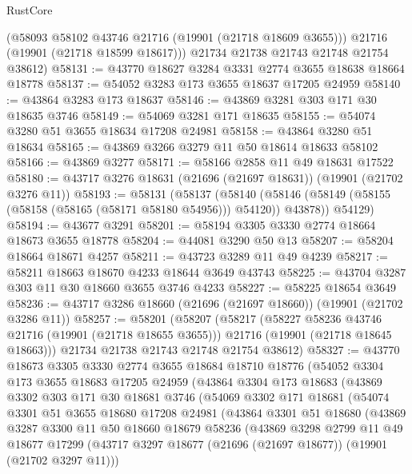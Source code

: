 \begin{lexlean}{RustCore}
\begin{coremodule}
        (@58093 @58102 @43746 @21716 (@19901 (@21718 @18609 @3655)))
        @21716
        (@19901 (@21718 @18599 @18617)))
      @21734
      @21738
      @21743
      @21748
      @21754
      @38612)
@58131 := @43770 @18627 @3284 @3331 @2774 @3655 @18638 @18664 @18778
@58137 := @54052 @3283 @173 @3655 @18637 @17205 @24959
@58140 := @43864 @3283 @173 @18637
@58146 := @43869 @3281 @303 @171 @30 @18635 @3746
@58149 := @54069 @3281 @171 @18635
@58155 := @54074 @3280 @51 @3655 @18634 @17208 @24981
@58158 := @43864 @3280 @51 @18634
@58165 := @43869 @3266 @3279 @11 @50 @18614 @18633 @58102
@58166 := @43869 @3277
@58171 := @58166 @2858 @11 @49 @18631 @17522
@58180 := @43717 @3276 @18631 (@21696 (@21697 @18631)) (@19901 (@21702 @3276 @11))
@58193 := @58131
    (@58137
      (@58140 (@58146 (@58149 (@58155 (@58158 (@58165 (@58171 @58180 @54956))) @54120)) @43878))
      @54129)
@58194 := @43677 @3291
@58201 := @58194 @3305 @3330 @2774 @18664 @18673 @3655 @18778
@58204 := @44081 @3290 @50 @13
@58207 := @58204 @18664 @18671 @4257
@58211 := @43723 @3289 @11 @49 @4239
@58217 := @58211 @18663 @18670 @4233 @18644 @3649 @43743
@58225 := @43704 @3287 @303 @11 @30 @18660 @3655 @3746 @4233
@58227 := @58225 @18654 @3649
@58236 := @43717 @3286 @18660 (@21696 (@21697 @18660)) (@19901 (@21702 @3286 @11))
@58257 := @58201
    (@58207
      (@58217
        (@58227 @58236 @43746 @21716 (@19901 (@21718 @18655 @3655)))
        @21716
        (@19901 (@21718 @18645 @18663)))
      @21734
      @21738
      @21743
      @21748
      @21754
      @38612)
@58327 := @43770
    @18673
    @3305
    @3330
    @2774
    @3655
    @18684
    @18710
    @18776
    (@54052
      @3304
      @173
      @3655
      @18683
      @17205
      @24959
      (@43864
        @3304
        @173
        @18683
        (@43869
          @3302
          @303
          @171
          @30
          @18681
          @3746
          (@54069
            @3302
            @171
            @18681
            (@54074
              @3301
              @51
              @3655
              @18680
              @17208
              @24981
              (@43864
                @3301
                @51
                @18680
                (@43869
                  @3287
                  @3300
                  @11
                  @50
                  @18660
                  @18679
                  @58236
                  (@43869
                    @3298
                    @2799
                    @11
                    @49
                    @18677
                    @17299
                    (@43717 @3297 @18677 (@21696 (@21697 @18677)) (@19901 (@21702 @3297 @11)))

\end{coremodule}
\end{lexlean}
